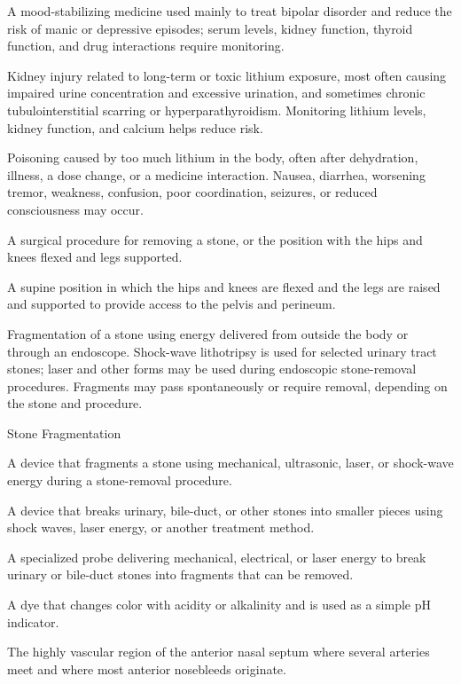  A mood-stabilizing medicine used mainly to treat bipolar disorder and reduce the risk of manic or depressive episodes; serum levels, kidney function, thyroid function, and drug interactions require monitoring.

 Kidney injury related to long-term or toxic lithium exposure, most often causing impaired urine concentration and excessive urination, and sometimes chronic tubulointerstitial scarring or hyperparathyroidism. Monitoring lithium levels, kidney function, and calcium helps reduce risk.

 Poisoning caused by too much lithium in the body, often after dehydration, illness, a dose change, or a medicine interaction. Nausea, diarrhea, worsening tremor, weakness, confusion, poor coordination, seizures, or reduced consciousness may occur.

 A surgical procedure for removing a stone, or the position with the hips and knees flexed and legs supported.

 A supine position in which the hips and knees are flexed and the legs are raised and supported to provide access to the pelvis and perineum.

 Fragmentation of a stone using energy delivered from outside the body or through an endoscope. Shock-wave lithotripsy is used for selected urinary tract stones; laser and other forms may be used during endoscopic stone-removal procedures. Fragments may pass spontaneously or require removal, depending on the stone and procedure.

\synonyms
Stone Fragmentation

 A device that fragments a stone using mechanical, ultrasonic, laser, or shock-wave energy during a
stone-removal procedure.

 A device that breaks urinary, bile-duct, or other stones into smaller pieces using shock waves, laser energy, or another treatment method.

 A specialized probe delivering mechanical, electrical, or laser energy to break urinary or bile-duct stones into fragments that can be removed.

 A dye that changes color with acidity or alkalinity and is used as a simple pH indicator.

 The highly vascular region of the anterior nasal septum where several arteries meet and where most anterior
nosebleeds originate.

